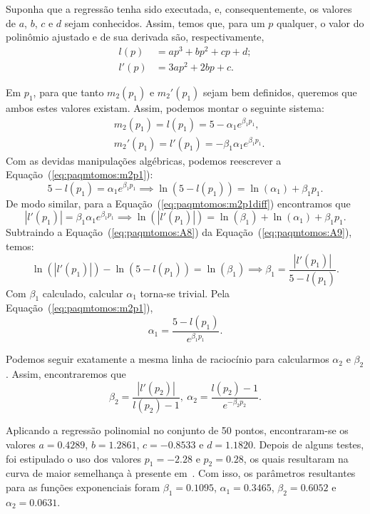 Suponha que a regressão tenha sido executada, e, consequentemente, os valores de $a$,
$b$, $c$ e $d$ sejam conhecidos. Assim, temos que, para um $p$ qualquer, o valor do
polinômio ajustado e de sua derivada são, respectivamente,
\begin{align}
	l(p)  & = a p^3 + b p^2 + c p + d; \\
	l'(p) & = 3a p^2 + 2 b p + c.
\end{align}

Em $p_1$, para que tanto $m_2(p_1)$ e $m_2'(p_1)$ sejam bem definidos, queremos que
ambos estes valores existam. Assim, podemos montar o seguinte sistema:
\begin{align}
	 & m_2(p_1) = l(p_1) = 5 - \alpha_1 e^{\beta_1 p_1},\label{eq:paqmtomos:m2p1}            \\
	 & m_2'(p_1) = l'(p_1) = -\beta_1 \alpha_1 e^{\beta_1 p_1}.\label{eq:paqmtomos:m2p1diff}
\end{align}
Com as devidas manipulações algébricas, podemos reescrever a Equação~(\ref{eq:paqmtomos:m2p1}):
\begin{equation}
	5 - l(p_1) = \alpha_1 e^{\beta_1 p_1} \implies \ln(5 - l(p_1)) = \ln(\alpha_1) + \beta_1 p_1.\label{eq:paqmtomos:A8}
\end{equation}
De modo similar, para a Equação~(\ref{eq:paqmtomos:m2p1diff}) encontramos que
\begin{equation}
	|l'(p_1)| = \beta_1 \alpha_1 e^{\beta_1 p_1} \implies \ln(|l'(p_1)|) = \ln(\beta_1) + \ln(\alpha_1) + \beta_1 p_1.\label{eq:paqmtomos:A9}
\end{equation}
Subtraindo a Equação~(\ref{eq:paqmtomos:A8}) da Equação~(\ref{eq:paqmtomos:A9}), temos:
\begin{equation}
	\ln(|l'(p_1)|) - \ln(5 - l(p_1)) = \ln(\beta_1) \implies \beta_1 = \frac{|l'(p_1)|}{5 - l(p_1)}.
\end{equation}
Com $\beta_1$ calculado, calcular $\alpha_1$ torna-se trivial. Pela Equação~(\ref{eq:paqmtomos:m2p1}),
\begin{equation}
	\alpha_1 = \frac{5 - l(p_1)}{e^{\beta_1 p_1}}.
\end{equation}

Podemos seguir exatamente a mesma linha de raciocínio para calcularmos $\alpha_2$ e
$\beta_2$. Assim, encontraremos que
\begin{equation}
	\beta_2 = \frac{|l'(p_2)|}{l(p_2) - 1},\ \alpha_2 = \frac{l(p_2) - 1}{e^{-\beta_2 p_2}}.
\end{equation}

Aplicando a regressão polinomial no conjunto de 50 pontos, encontraram-se os valores $a
	= 0.4289$, $b = 1.2861$, $c = -0.8533$ e $d = 1.1820$. Depois de alguns testes, foi
estipulado o uso dos valores $p_1 = -2.28$ e $p_2 = 0.28$, os quais resultaram na curva
de maior semelhança à presente em~\cite{beerends-2002}. Com isso, os parâmetros
resultantes para as funções exponenciais foram $\beta_1 = 0.1095$, $\alpha_1 = 0.3465$,
$\beta_2 = 0.6052$ e $\alpha_2 = 0.0631$.


